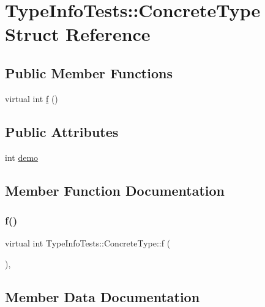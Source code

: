 \hypertarget{structTypeInfoTests_1_1ConcreteType}{}\section{Type\+Info\+Tests\+::Concrete\+Type Struct Reference}
\label{structTypeInfoTests_1_1ConcreteType}
\subsection*{Public Member Functions}
\begin{DoxyCompactItemize}
\item 
virtual int \mbox{\hyperlink{structTypeInfoTests_1_1ConcreteType_a9d98d467fe3d0d5c8d2bf929a52279d9}{f}} ()
\end{DoxyCompactItemize}
\subsection*{Public Attributes}
\begin{DoxyCompactItemize}
\item 
int \mbox{\hyperlink{structTypeInfoTests_1_1ConcreteType_a2a1d83d1b58e439c4eb9ff397dfa7e97}{demo}}
\end{DoxyCompactItemize}


\subsection{Member Function Documentation}
\mbox{\label{structTypeInfoTests_1_1ConcreteType_a9d98d467fe3d0d5c8d2bf929a52279d9}} 
\subsubsection{\texorpdfstring{f()}{f()}}
{\footnotesize\ttfamily virtual int Type\+Info\+Tests\+::\+Concrete\+Type\+::f (\begin{DoxyParamCaption}{ }\end{DoxyParamCaption})\hspace{0.3cm}{\ttfamily [inline]}, {\ttfamily [virtual]}}



\subsection{Member Data Documentation}
\mbox{\label{structTypeInfoTests_1_1ConcreteType_a2a1d83d1b58e439c4eb9ff397dfa7e97}} 
